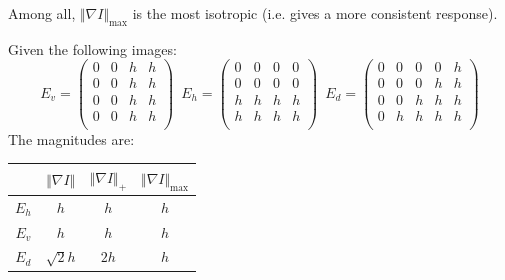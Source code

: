 \begin{description}
        Among all, $\Vert \nabla I \Vert_\text{max}$ is the most isotropic (i.e. gives a more consistent response).
        \begin{example}
            Given the following images:
            \[
                E_v = \begin{pmatrix}
                    0 & 0 & h & h \\
                    0 & 0 & h & h \\
                    0 & 0 & h & h \\
                    0 & 0 & h & h \\
                \end{pmatrix}
                \,\,\,
                E_h = \begin{pmatrix}
                    0 & 0 & 0 & 0 \\
                    0 & 0 & 0 & 0 \\
                    h & h & h & h \\
                    h & h & h & h \\
                \end{pmatrix}
                \,\,\,
                E_d = \begin{pmatrix}
                    0 & 0 & 0 & 0 & h \\
                    0 & 0 & 0 & h & h \\
                    0 & 0 & h & h & h \\
                    0 & h & h & h & h \\
                \end{pmatrix}
            \]
            The magnitudes are:
            \begin{center}
                \begin{tabular}{c|ccc}
                    \toprule
                        & $\Vert \nabla I \Vert$ & $\Vert \nabla I \Vert_+$ & $\Vert \nabla I \Vert_\text{max}$ \\
                    \midrule
                    $E_h$ & $h$ & $h$ & $h$ \\
                    $E_v$ & $h$ & $h$ & $h$ \\
                    $E_d$ & $\sqrt{2}h$ & $2h$ & $h$ \\
                    \bottomrule
                \end{tabular}
            \end{center}
        \end{example}
\end{description}

